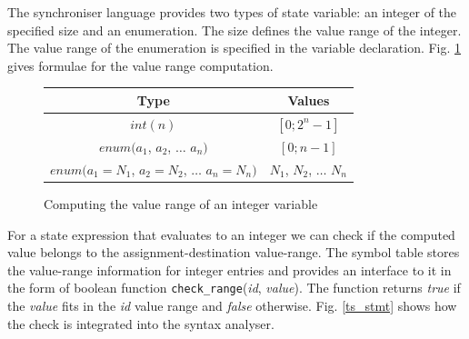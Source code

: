 


The synchroniser language provides two types of state variable: an integer of the specified size and an enumeration. The size defines the value range of the integer. The value range of the enumeration is specified in the variable declaration. Fig. \ref{int_range} gives formulae for the value range computation.


\begin{figure}%
\centering
\begin{tabular}{|c|c|}
\hline
Type & Values\\
\hline
$int(n)$ & $[0; 2^{n}-1]$\\
\hline
$enum(a_1$, $a_2$, $\dots$ $a_n)$ & $[0; n-1]$\\
\hline
$enum(a_1=N_1$, $a_2=N_2$, $\dots$ $a_n=N_n)$ & $N_1$, $N_2$, $\dots$ $N_n$\\
\hline
\end{tabular}
\caption{Computing the value range of an integer variable\label{int_range}}
\end{figure}

For a state expression that evaluates to an integer we can check if the computed value belongs to the assignment-destination value-range. The symbol table stores the value-range information for integer entries and provides an interface to it in the form of boolean function \texttt{check\_range}(\emph{id}, \emph{value}). The function returns \emph{true} if the \emph{value} fits in the \emph{id} value range and \emph{false} otherwise. Fig. \ref{ts_stmt} shows how the check is integrated into the syntax analyser.

